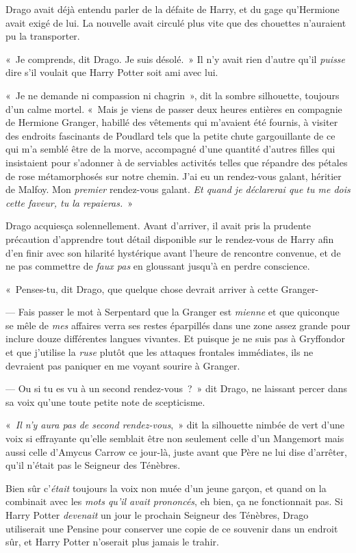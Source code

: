 Drago avait déjà entendu parler de la défaite de Harry, et du gage qu'Hermione avait exigé de lui. La nouvelle avait circulé plus vite que des chouettes n'auraient pu la transporter.

«~Je comprends, dit Drago. Je suis désolé.~» Il n'y avait rien d'autre qu'il \emph{puisse} dire s'il voulait que Harry Potter soit ami avec lui.

«~Je ne demande ni compassion ni chagrin~», dit la sombre silhouette, toujours d'un calme mortel. «~Mais je viens de passer deux heures entières en compagnie de Hermione Granger, habillé des vêtements qui m'avaient été fournis, à visiter des endroits fascinants de Poudlard tels que la petite chute gargouillante de ce qui m'a semblé être de la morve, accompagné d'une quantité d'autres filles qui insistaient pour s'adonner à de serviables activités telles que répandre des pétales de rose métamorphosés sur notre chemin. J'ai eu un rendez-vous galant, héritier de Malfoy. Mon \emph{premier} rendez-vous galant. \emph{Et quand je déclarerai que tu me dois cette faveur, tu la repaieras.}~»

Drago acquiesça solennellement. Avant d'arriver, il avait pris la prudente précaution d'apprendre tout détail disponible sur le rendez-vous de Harry afin d'en finir avec son hilarité hystérique avant l'heure de rencontre convenue, et de ne pas commettre de \emph{faux pas} en gloussant jusqu'à en perdre conscience.

«~Penses-tu, dit Drago, que quelque chose devrait arriver à cette Granger-

--- Fais passer le mot à Serpentard que la Granger est \emph{mienne} et que quiconque se mêle de \emph{mes} affaires verra ses restes éparpillés dans une zone assez grande pour inclure douze différentes langues vivantes. Et puisque je ne suis pas à Gryffondor et que j'utilise la \emph{ruse} plutôt que les attaques frontales immédiates, ils ne devraient pas paniquer en me voyant sourire à Granger.

--- Ou si tu es vu à un second rendez-vous~?~» dit Drago, ne laissant percer dans sa voix qu'une toute petite note de scepticisme.

«~\emph{Il n'y aura pas de second rendez-vous},~» dit la silhouette nimbée de vert d'une voix si effrayante qu'elle semblait être non seulement celle d'un Mangemort mais aussi celle d'Amycus Carrow ce jour-là, juste avant que Père ne lui dise d'arrêter, qu'il n'était pas le Seigneur des Ténèbres.

Bien sûr c'\emph{était} toujours la voix non muée d'un jeune garçon, et quand on la combinait avec les \emph{mots qu'il avait prononcés}, eh bien, ça ne fonctionnait pas. Si Harry Potter \emph{devenait} un jour le prochain Seigneur des Ténèbres, Drago utiliserait une Pensine pour conserver une copie de ce souvenir dans un endroit sûr, et Harry Potter n'oserait plus jamais le trahir.

